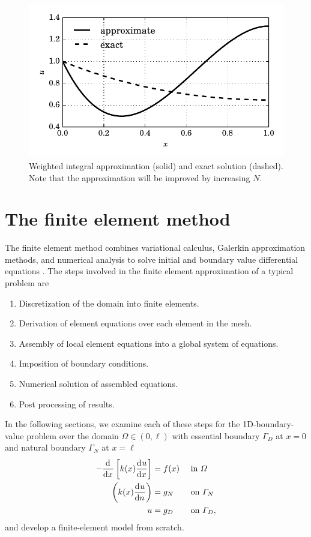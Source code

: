 \begin{figure}
  \centering
    \includegraphics[width=\linewidth]{images/fenics_intro/weight_int.pdf}
  \caption[FEM intro scratch example]{Weighted integral approximation (solid) and exact solution (dashed).  Note that the approximation will be improved by increasing $N$.}
  \label{scratch_example_image}
\end{figure}


\section{The finite element method}

The finite element method combines variational calculus, Galerkin approximation methods, and numerical analysis to solve initial and boundary value differential equations \citep{reddy_1993}.  The steps involved in the finite element approximation of a typical problem are
\begin{enumerate}
  \item Discretization of the domain into finite elements.
  \item Derivation of element equations over each element in the mesh.
  \item Assembly of local element equations into a global system of equations.
  \item Imposition of boundary conditions.
  \item Numerical solution of assembled equations.
  \item Post processing of results.
\end{enumerate}

In the following sections, we examine each of these steps for the 1D-boundary-value problem \citep{davis_2013} over the domain $\Omega \in (0,\ell)$ with essential boundary $\Gamma_D$ at $x=0$ and natural boundary $\Gamma_N$ at $x=\ell$
\begin{align}
  \label{intro_ode}
  -\frac{\mathrm{d}^{} }{\mathrm{d} x^{} } \left[ k(x) \frac{\mathrm{d}^{} u}{\mathrm{d} x^{} } \right] &= f(x) && \text{ in } \varOmega \\
  \label{intro_ode_nbc}
  \left( k(x) \frac{\mathrm{d}^{} u}{\mathrm{d} n^{} } \right) &= g_N && \text{ on } \varGamma_N \\
  \label{intro_ode_ebc}
  u &= g_D && \text{ on } \varGamma_D,
\end{align}
and develop a finite-element model from scratch.

